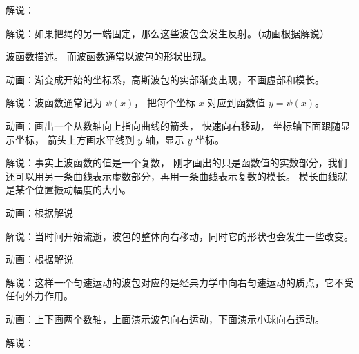 解说：

解说：如果把绳的另一端固定，那么这些波包会发生反射。（动画根据解说）




波函数描述。 而波函数通常以波包的形状出现。

动画：渐变成开始的坐标系，高斯波包的实部渐变出现，不画虚部和模长。

解说：波函数通常记为 $\psi(x)$， 把每个坐标 $x$ 对应到函数值 $y = \psi(x)$。

动画：画出一个从数轴向上指向曲线的箭头， 快速向右移动， 坐标轴下面跟随显示坐标， 箭头上方画水平线到 $y$ 轴，显示 $y$ 坐标。

解说：事实上波函数的值是一个复数， 刚才画出的只是函数值的实数部分，我们还可以用另一条曲线表示虚数部分，再用一条曲线表示复数的模长。 模长曲线就是某个位置振动幅度的大小。

动画：根据解说

解说：当时间开始流逝，波包的整体向右移动，同时它的形状也会发生一些改变。

动画：根据解说

解说：这样一个匀速运动的波包对应的是经典力学中向右匀速运动的质点，它不受任何外力作用。

动画：上下画两个数轴，上面演示波包向右运动，下面演示小球向右运动。

解说：
